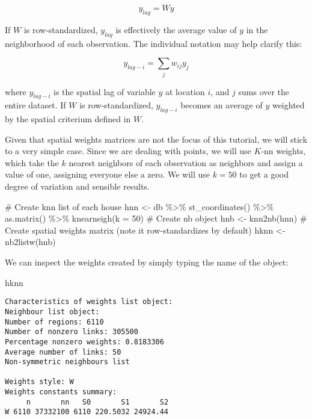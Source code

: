 \documentclass[
  letterpaper,
  krantz2]{style/krantz}
\newenvironment{Shaded}{\begin{snugshade}}{\end{snugshade}}
\newcommand{\AttributeTok}[1]{\textcolor[rgb]{0.40,0.45,0.13}{#1}}
\newcommand{\CommentTok}[1]{\textcolor[rgb]{0.37,0.37,0.37}{#1}}
\newcommand{\DecValTok}[1]{\textcolor[rgb]{0.68,0.00,0.00}{#1}}
\newcommand{\FunctionTok}[1]{\textcolor[rgb]{0.28,0.35,0.67}{#1}}
\newcommand{\NormalTok}[1]{\textcolor[rgb]{0.00,0.23,0.31}{#1}}
\newcommand{\OtherTok}[1]{\textcolor[rgb]{0.00,0.23,0.31}{#1}}
\newcommand{\SpecialCharTok}[1]{\textcolor[rgb]{0.37,0.37,0.37}{#1}}
\begin{document}
\[
y_{lag} = W y
\]

If \(W\) is row-standardized, \(y_{lag}\) is effectively the average
value of \(y\) in the neighborhood of each observation. The individual
notation may help clarify this:

\[
y_{lag-i} = \displaystyle \sum_j w_{ij} y_j
\]

where \(y_{lag-i}\) is the spatial lag of variable \(y\) at location
\(i\), and \(j\) sums over the entire dataset. If \(W\) is
row-standardized, \(y_{lag-i}\) becomes an average of \(y\) weighted by
the spatial criterium defined in \(W\).

Given that spatial weights matrices are not the focus of this tutorial,
we will stick to a very simple case. Since we are dealing with points,
we will use \(K\)-nn weights, which take the \(k\) nearest neighbors of
each observation as neighbors and assign a value of one, assigning
everyone else a zero. We will use \(k=50\) to get a good degree of
variation and sensible results.

\begin{Shaded}
\begin{Highlighting}[]
\CommentTok{\# Create knn list of each house}
\NormalTok{hnn }\OtherTok{\textless{}{-}}\NormalTok{ db }\SpecialCharTok{\%\textgreater{}\%}
  \FunctionTok{st\_coordinates}\NormalTok{() }\SpecialCharTok{\%\textgreater{}\%}
  \FunctionTok{as.matrix}\NormalTok{() }\SpecialCharTok{\%\textgreater{}\%}
  \FunctionTok{knearneigh}\NormalTok{(}\AttributeTok{k =} \DecValTok{50}\NormalTok{)}
\CommentTok{\# Create nb object}
\NormalTok{hnb }\OtherTok{\textless{}{-}} \FunctionTok{knn2nb}\NormalTok{(hnn)}
\CommentTok{\# Create spatial weights matrix (note it row{-}standardizes by default)}
\NormalTok{hknn }\OtherTok{\textless{}{-}} \FunctionTok{nb2listw}\NormalTok{(hnb)}
\end{Highlighting}
\end{Shaded}

We can inspect the weights created by simply typing the name of the
object:

\begin{Shaded}
\begin{Highlighting}[]
\NormalTok{hknn}
\end{Highlighting}
\end{Shaded}

\begin{verbatim}
Characteristics of weights list object:
Neighbour list object:
Number of regions: 6110 
Number of nonzero links: 305500 
Percentage nonzero weights: 0.8183306 
Average number of links: 50 
Non-symmetric neighbours list

Weights style: W 
Weights constants summary:
     n       nn   S0       S1       S2
W 6110 37332100 6110 220.5032 24924.44
\end{verbatim}
\end{document}
